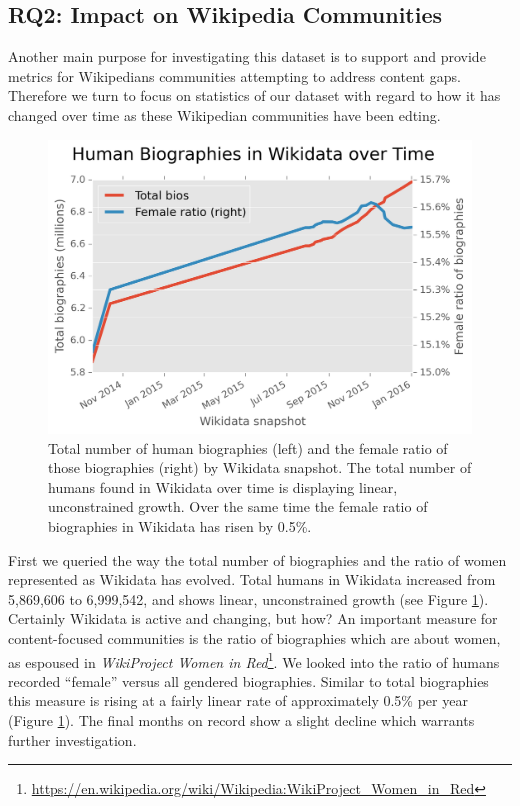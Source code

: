\documentclass{sig-alternate-05-2015}
\begin{document}
\subsection{RQ2: Impact on Wikipedia Communities}
Another main purpose for investigating this dataset is to support and provide metrics for Wikipedians communities attempting to  address content gaps. Therefore we turn to focus on statistics of our dataset with regard to how it has changed over time as these Wiki\-pedian communities have been edting. 

\begin{figure}
\includegraphics[width=\columnwidth]{figures/totalfrb.png} 
\caption{Total number of human biographies (left) and the female ratio of those biographies (right) by Wikidata snapshot. The total number of humans found in Wikidata over time is displaying linear, unconstrained growth. Over the same time the female ratio of biographies in Wikidata has risen by 0.5\%.}
\label{fig:totalfrb}
\end{figure}

First we queried the way the total number of biographies and the ratio of women represented as Wikidata has evolved. Total humans in Wikidata increased from 5,869,606 to 6,999,542, and shows linear, unconstrained growth (see Figure \ref{fig:totalfrb}). Certainly Wikidata is active and changing, but how? An important measure for content-focused communities is the ratio of biographies which are about women, as espoused in \textit{WikiProject Women in Red}\footnote{\url{https://en.wikipedia.org/wiki/Wikipedia:WikiProject_Women_in_Red}}. We looked into the ratio of  humans recorded ``female'' versus all gendered biographies. Similar to total biographies this measure is rising at a fairly linear rate of approximately 0.5\% per year (Figure \ref{fig:totalfrb}). The final months on record show a slight decline which warrants further investigation. 
\end{document}
